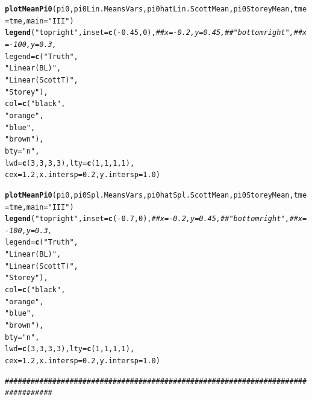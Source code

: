 \documentclass{article}\usepackage[]{graphicx}\usepackage[]{color}
\makeatletter
\newcommand{\hlnum}[1]{\textcolor[rgb]{0.686,0.059,0.569}{#1}}%
\newcommand{\hlstr}[1]{\textcolor[rgb]{0.192,0.494,0.8}{#1}}%
\newcommand{\hlcom}[1]{\textcolor[rgb]{0.678,0.584,0.686}{\textit{#1}}}%
\newcommand{\hlopt}[1]{\textcolor[rgb]{0,0,0}{#1}}%
\newcommand{\hlstd}[1]{\textcolor[rgb]{0.345,0.345,0.345}{#1}}%
\newcommand{\hlkwc}[1]{\textcolor[rgb]{0.333,0.667,0.333}{#1}}%
\newcommand{\hlkwd}[1]{\textcolor[rgb]{0.737,0.353,0.396}{\textbf{#1}}}%
\newenvironment{kframe}{%
 \def\at@end@of@kframe{}%
 \ifinner\ifhmode%
  \def\at@end@of@kframe{\end{minipage}}%
  \begin{minipage}{\columnwidth}%
 \fi\fi%
 \def\FrameCommand##1{\hskip\@totalleftmargin \hskip-\fboxsep
 \colorbox{shadecolor}{##1}\hskip-\fboxsep
     \hskip-\linewidth \hskip-\@totalleftmargin \hskip\columnwidth}%
 \MakeFramed {\advance\hsize-\width
   \@totalleftmargin\z@ \linewidth\hsize
   \@setminipage}}%
 {\par\unskip\endMakeFramed%
 \at@end@of@kframe}
\newenvironment{knitrout}{}{} %
\makeatother
\begin{document}
\begin{knitrout}
\begin{kframe}
\begin{alltt}
\hlkwd{plotMeanPi0}\hlstd{(pi0, pi0Lin.MeansVars, pi0hatLin.ScottMean, pi0StoreyMean,} \hlkwc{tme}\hlstd{=tme,} \hlkwc{main}\hlstd{=}\hlstr{"III"}\hlstd{)}
\hlkwd{legend}\hlstd{(}\hlstr{"topright"}\hlstd{,} \hlkwc{inset}\hlstd{=}\hlkwd{c}\hlstd{(}\hlopt{-}\hlnum{0.45}\hlstd{,}\hlnum{0}\hlstd{),}\hlcom{##x=-0.2, y=0.45,##"bottomright", ##x=-100, y=0.3, }
       \hlkwc{legend}\hlstd{=}\hlkwd{c}\hlstd{(}\hlstr{"Truth"}\hlstd{,}
                \hlstr{"Linear (BL)"}\hlstd{,}
                \hlstr{"Linear (Scott T)"}\hlstd{,}
                \hlstr{"Storey"}\hlstd{),}
       \hlkwc{col}\hlstd{=}\hlkwd{c}\hlstd{(}\hlstr{"black"}\hlstd{,}
             \hlstr{"orange"}\hlstd{,}
             \hlstr{"blue"}\hlstd{,}
             \hlstr{"brown"}\hlstd{),}
       \hlkwc{bty}\hlstd{=}\hlstr{"n"}\hlstd{,}
       \hlkwc{lwd}\hlstd{=}\hlkwd{c}\hlstd{(}\hlnum{3}\hlstd{,}\hlnum{3}\hlstd{,}\hlnum{3}\hlstd{,}\hlnum{3}\hlstd{),} \hlkwc{lty}\hlstd{=}\hlkwd{c}\hlstd{(}\hlnum{1}\hlstd{,}\hlnum{1}\hlstd{,}\hlnum{1}\hlstd{,}\hlnum{1}\hlstd{),}
       \hlkwc{cex}\hlstd{=}\hlnum{1.2}\hlstd{,} \hlkwc{x.intersp}\hlstd{=}\hlnum{0.2}\hlstd{,} \hlkwc{y.intersp}\hlstd{=}\hlnum{1.0}\hlstd{)}

\hlkwd{plotMeanPi0}\hlstd{(pi0, pi0Spl.MeansVars, pi0hatSpl.ScottMean, pi0StoreyMean,} \hlkwc{tme}\hlstd{=tme,} \hlkwc{main}\hlstd{=}\hlstr{"III"}\hlstd{)}
\hlkwd{legend}\hlstd{(}\hlstr{"topright"}\hlstd{,} \hlkwc{inset}\hlstd{=}\hlkwd{c}\hlstd{(}\hlopt{-}\hlnum{0.7}\hlstd{,}\hlnum{0}\hlstd{),}\hlcom{##x=-0.2, y=0.45,##"bottomright", ##x=-100, y=0.3, }
       \hlkwc{legend}\hlstd{=}\hlkwd{c}\hlstd{(}\hlstr{"Truth"}\hlstd{,}
                \hlstr{"Linear (BL)"}\hlstd{,}
                \hlstr{"Linear (Scott T)"}\hlstd{,}
                \hlstr{"Storey"}\hlstd{),}
       \hlkwc{col}\hlstd{=}\hlkwd{c}\hlstd{(}\hlstr{"black"}\hlstd{,}
             \hlstr{"orange"}\hlstd{,}
             \hlstr{"blue"}\hlstd{,}
             \hlstr{"brown"}\hlstd{),}
       \hlkwc{bty}\hlstd{=}\hlstr{"n"}\hlstd{,}
       \hlkwc{lwd}\hlstd{=}\hlkwd{c}\hlstd{(}\hlnum{3}\hlstd{,}\hlnum{3}\hlstd{,}\hlnum{3}\hlstd{,}\hlnum{3}\hlstd{),} \hlkwc{lty}\hlstd{=}\hlkwd{c}\hlstd{(}\hlnum{1}\hlstd{,}\hlnum{1}\hlstd{,}\hlnum{1}\hlstd{,}\hlnum{1}\hlstd{),}
       \hlkwc{cex}\hlstd{=}\hlnum{1.2}\hlstd{,} \hlkwc{x.intersp}\hlstd{=}\hlnum{0.2}\hlstd{,} \hlkwc{y.intersp}\hlstd{=}\hlnum{1.0}\hlstd{)}

\hlcom{#################################################################################}


\end{alltt}
\end{kframe}
\end{knitrout}
\end{document}
